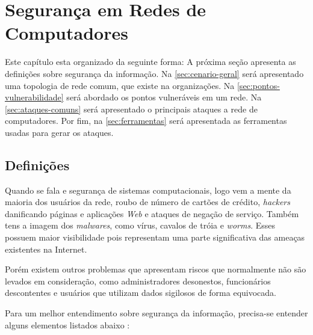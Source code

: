 \chapter{Segurança em Redes de Computadores} \label{ch:segurança}

Este capítulo esta organizado da seguinte forma: A próxima seção apresenta as definições sobre segurança da informação. Na \autoref{sec:cenario-geral} será apresentado uma topologia de rede comum, que existe na organizações. Na \autoref{sec:pontos-vulnerabilidade} será abordado os pontos vulneráveis em um rede. Na \autoref{sec:ataques-comuns} será apresentado o principais ataques a rede de computadores. Por fim, na \autoref{sec:ferramentas} será apresentada as ferramentas usadas para gerar os ataques.

\section{Definições} \label{sec:definições}

Quando se fala e segurança de sistemas computacionais, logo vem a mente da maioria dos usuários da rede, roubo de número de cartões de crédito, \textit{hackers} danificando páginas e aplicações \textit{Web} e ataques de negação de serviço. Também tens a imagem dos \textit{malwares}, como vírus, cavalos de tróia e \textit{worms}. Esses possuem maior visibilidade pois representam uma parte significativa das ameaças existentes na Internet.

Porém existem outros problemas que apresentam riscos que normalmente não são levados em consideração, como administradores desonestos, funcionários descontentes e usuários que utilizam dados sigilosos de forma equivocada.

Para um melhor entendimento sobre segurança da informação, precisa-se entender alguns elementos listados abaixo \cite{esr-gestao}:

